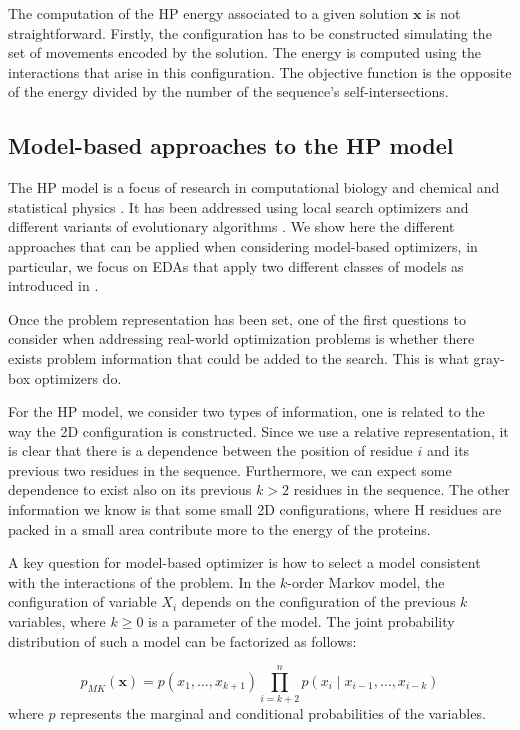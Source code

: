  The computation of the HP energy associated to a given solution  $\textbf{x}$ is not straightforward. Firstly,  the configuration has to be constructed simulating the set of movements encoded by the solution. The energy is computed using the interactions that arise in this configuration. The objective function  is the opposite of the energy divided by the number of the sequence's self-intersections.  

 \subsection{Model-based approaches to the HP model}

  The HP model is a focus of research in computational biology  \cite{Gupta_et_al:2005} and  chemical and statistical physics \cite{Kou_et_al:2006,Abe_and_Wako:2006}. It has been addressed using local search optimizers  \cite{Hsu_et_al:2003a} and different variants of evolutionary algorithms  \cite{Unger_and_Moult:1993}. We show here the different approaches that can be applied when considering model-based optimizers, in particular, we focus on EDAs that apply two different classes of models as introduced in \cite{Santana_et_al:2008a}. 

 Once the problem representation has been set, one of the first questions to consider when addressing real-world optimization problems is whether there exists problem information that could be added to the search. This is what gray-box optimizers do.

 For the HP model, we consider two types of information, one is related to the way the 2D configuration is constructed. Since we use a relative representation, it is clear that there is a dependence between the position of residue $i$ and its previous two residues in the sequence. Furthermore, we can expect some  dependence to exist also on its previous $k>2$ residues in the sequence. The other information we know is that some small 2D configurations, where H residues are packed in a small area  contribute more to the energy of the proteins.

 A key question for model-based optimizer is  how to select a model consistent with the interactions of the problem. In the $k$-order Markov model,  the configuration of variable $X_i$ depends on the configuration of the previous $k$ variables, where $k \geq 0$ is a parameter  of the model.  The joint probability distribution of such a model can be factorized as follows:

\begin{equation}
 p_{MK}(\textbf{x}) =  p(x_{1}, \ldots, x_{k+1})  \prod_{i=k+2}^{n}  p( x_{i} \mid  {x_{i-1}, \ldots, x_{i-k}})
\end{equation}
where $p$ represents the marginal and conditional probabilities of the variables. 

